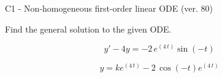 \begin{exercise}
  \begin{exerciseTitle}C1 - Non-homogeneous first-order linear ODE (ver. 80)\end{exerciseTitle}
  \begin{exerciseStatement}
    
Find the general solution to the given ODE.

    
\[y'-4y= -2 \, e^{\left(4 \, t\right)} \sin\left(-t\right)\]

  \end{exerciseStatement}
  \begin{exerciseAnswer}
    
\[y= k e^{\left(4 \, t\right)} - 2 \, \cos\left(-t\right) e^{\left(4 \, t\right)}\]

  \end{exerciseAnswer}
\end{exercise}